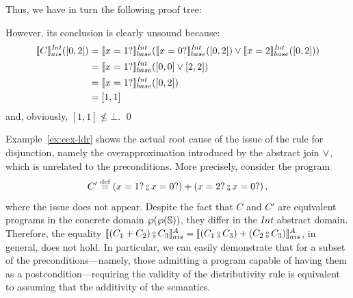 \documentclass[
  10pt,       %
  twoside,    %
  a4paper,    %
  english,    %
  tikz,       %
  openright,  %
]{book}
\begin{document}
\begin{example}
  Thus, we have in turn the following proof tree:
  \begin{prooftree}
  \end{prooftree}

\noindent
  However, its conclusion is  clearly unsound because:
  \begin{align*}
    \asem[\mathit{Int}]{C}([0, 2]) &= \bsem{x = 1?}^{\mathit{Int}}(\bsem{x = 0?}^{\mathit{Int}}([0, 2]) 
      \join \bsem{x = 2}^{\mathit{Int}}([0, 2])) \\
                          &= \bsem{x = 1?}^{\mathit{Int}}([0, 0] \join [2, 2]) \\
                          &= \bsem{x = 1?}^{\mathit{Int}}([0, 2]) \\
                          &= [1, 1]
  \end{align*}
%
  and, obviously, $[1, 1] \not \leq \bot$. \qed
\end{example}

Example~\ref{ex:cex-ldr} shows the actual root cause of the issue of the rule
for disjunction, namely the overapproximation 
introduced by the abstract join $\join$, which is unrelated to the preconditions. 
More precisely, 
consider the program $$C' \defeq (x = 1? \fcmp x = 0?) + (x = 2? \fcmp x = 0?)\, ,$$
where the issue does not appear. Despite the fact that $C$ and $C'$ are equivalent
programs in the concrete domain $\pow{\pow{\states}}$, they differ in the
$\mathit{Int}$ abstract domain. Therefore, the equality $\asem{(C_1 + C_2) \fcmp C_3} =
\asem{(C_1 \fcmp C_3) + (C_2 \fcmp C_3)}$, in general, does not hold.
In particular, we can easily demonstrate that for a subset of the preconditions---namely, those admitting a program capable of having them as a postcondition---requiring the validity of
the distributivity rule is equivalent to assuming that the additivity of the semantics.
\end{document}
